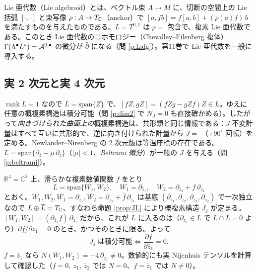 \begin{center}
\end{center}

\begin{rem}
Lie 亜代数（Lie algebroid）とは、ベクトル束 $A\to M$ に、切断の空間上の Lie 括弧 $[\cdot,\cdot]$ と束写像 $\rho:A\to T_{\mathbb C}$（anchor）で $[a,fb]=f[a,b]+(\rho(a)f)\,b$ を満たすものを与えたものである。$L=T^{0,1}$ は $\rho=$ 包含で、複素 Lie 亜代数である。このとき Lie 亜代数のコホモロジー（Chevalley--Eilenberg 複体）$\Gamma(\Lambda^\bullet L^*)=\mathcal A^{0,\bullet}$ の微分が $\bar\partial$ になる（問 \ref{p:Lalg}）。第11巻で Lie 亜代数を一般に導入する。
\end{rem}

\subsection{実 2 次元と実 4 次元}
\begin{ex}[実 2 次元：$J$ はすべて積分可能]\label{ex:dim2}
$\operatorname{rank}L=1$ なので $L=\mathrm{span}\{Z\}$ で、$[fZ,gZ]=(fZg-gZf)Z\in L$。ゆえに任意の概複素構造は積分可能（問 \ref{p:dim2} で $N_J=0$ も直接確かめる）。したがって\emph{向きづけられた曲面上の}概複素構造は、共形類と同じ情報である：$J$-不変計量はすべて互いに共形的で、逆に向き付けられた計量から $J=$ （$+90^\circ$ 回転）を定める。Newlander--Nirenberg の 2 次元版は等温座標の存在である。$L=\mathrm{span}\{\partial_{\bar z}-\mu\,\partial_z\}$（$|\mu|<1$、\emph{Beltrami 微分}）が一般の $J$ を与える（問 \ref{p:beltrami}）。
\end{ex}

\begin{ex}[実 4 次元：積分可能でない $J$]\label{ex:nonint}
$\mathbb R^4=\mathbb C^2$ 上、滑らかな複素数値関数 $f$ をとり
\[
L=\mathrm{span}\{W_1,W_2\},\quad W_1=\partial_{\bar z_1},\quad W_2=\partial_{\bar z_2}+f\,\partial_{z_1}
\]
とおく。$W_1,W_2,\overline{W_1}=\partial_{z_1},\overline{W_2}=\partial_{z_2}+\bar f\,\partial_{\bar z_1}$ は基底 $(\partial_{z_1},\partial_{z_2},\partial_{\bar z_1},\partial_{\bar z_2})$ で一次独立なので $L\oplus\overline L=T_{\mathbb C}$、すなわち命題 \ref{prop:JL} により概複素構造 $J_f$ が定まる。
$[W_1,W_2]=(\partial_{\bar z_1}f)\,\partial_{z_1}$ だから、これが $L$ に入るのは（$\partial_{z_1}\in\overline L$ で $L\cap\overline L=0$ より）$\partial f/\partial\bar z_1=0$ のとき、かつそのときに限る。よって
\[
J_f\ \text{は積分可能}\iff \frac{\partial f}{\partial\bar z_1}=0 .
\]
$f=\bar z_1$ なら $N(W_1,W_2)=-4\,\partial_{z_1}\ne0$。数値的にも実 Nijenhuis テンソルを計算して確認した（$f=0,\ z_1,\ \bar z_2$ では $N=0$、$f=\bar z_1$ では $N\ne0$）。
\end{ex}

